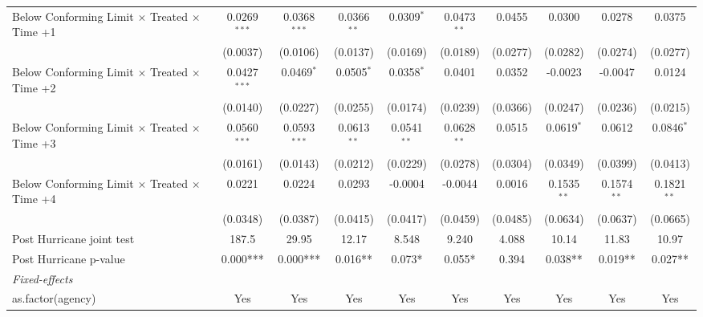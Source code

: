 \begin{tabular}{lccccccccc}
   Below Conforming Limit $\times$ Treated $\times$ Time +1   & 0.0269$^{***}$ & 0.0368$^{***}$ & 0.0366$^{**}$ & 0.0309$^{*}$  & 0.0473$^{**}$  & 0.0455        & 0.0300        & 0.0278        & 0.0375\\   
                                                              & (0.0037)       & (0.0106)       & (0.0137)      & (0.0169)      & (0.0189)       & (0.0277)      & (0.0282)      & (0.0274)      & (0.0277)\\   
   Below Conforming Limit $\times$ Treated $\times$ Time +2   & 0.0427$^{***}$ & 0.0469$^{*}$   & 0.0505$^{*}$  & 0.0358$^{*}$  & 0.0401         & 0.0352        & -0.0023       & -0.0047       & 0.0124\\   
                                                              & (0.0140)       & (0.0227)       & (0.0255)      & (0.0174)      & (0.0239)       & (0.0366)      & (0.0247)      & (0.0236)      & (0.0215)\\   
   Below Conforming Limit $\times$ Treated $\times$ Time +3   & 0.0560$^{***}$ & 0.0593$^{***}$ & 0.0613$^{**}$ & 0.0541$^{**}$ & 0.0628$^{**}$  & 0.0515        & 0.0619$^{*}$  & 0.0612        & 0.0846$^{*}$\\   
                                                              & (0.0161)       & (0.0143)       & (0.0212)      & (0.0229)      & (0.0278)       & (0.0304)      & (0.0349)      & (0.0399)      & (0.0413)\\   
   Below Conforming Limit $\times$ Treated $\times$ Time +4   & 0.0221         & 0.0224         & 0.0293        & -0.0004       & -0.0044        & 0.0016        & 0.1535$^{**}$ & 0.1574$^{**}$ & 0.1821$^{**}$\\   
                                                              & (0.0348)       & (0.0387)       & (0.0415)      & (0.0417)      & (0.0459)       & (0.0485)      & (0.0634)      & (0.0637)      & (0.0665)\\   
   Post Hurricane joint test                                  & 187.5          & 29.95          & 12.17         & 8.548         & 9.240          & 4.088         & 10.14         & 11.83         & 10.97\\  
   Post Hurricane p-value                                     & 0.000***       & 0.000***       & 0.016**       & 0.073*        & 0.055*         & 0.394         & 0.038**       & 0.019**       & 0.027**\\  
   \midrule
   \emph{Fixed-effects}\\
   as.factor(agency)                                          & Yes            & Yes            & Yes           & Yes           & Yes            & Yes           & Yes           & Yes           & Yes\\  

\end{tabular}
